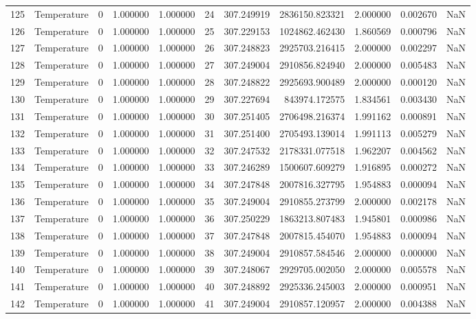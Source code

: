 \begin{tabular}{llrrrrrrrrr}
125 & Temperature & 0 & 1.000000 & 1.000000 & 24 & 307.249919 & 2836150.823321 & 2.000000 & 0.002670 & NaN \\
126 & Temperature & 0 & 1.000000 & 1.000000 & 25 & 307.229153 & 1024862.462430 & 1.860569 & 0.000796 & NaN \\
127 & Temperature & 0 & 1.000000 & 1.000000 & 26 & 307.248823 & 2925703.216415 & 2.000000 & 0.002297 & NaN \\
128 & Temperature & 0 & 1.000000 & 1.000000 & 27 & 307.249004 & 2910856.824940 & 2.000000 & 0.005483 & NaN \\
129 & Temperature & 0 & 1.000000 & 1.000000 & 28 & 307.248822 & 2925693.900489 & 2.000000 & 0.000120 & NaN \\
130 & Temperature & 0 & 1.000000 & 1.000000 & 29 & 307.227694 & 843974.172575 & 1.834561 & 0.003430 & NaN \\
131 & Temperature & 0 & 1.000000 & 1.000000 & 30 & 307.251405 & 2706498.216374 & 1.991162 & 0.000891 & NaN \\
132 & Temperature & 0 & 1.000000 & 1.000000 & 31 & 307.251400 & 2705493.139014 & 1.991113 & 0.005279 & NaN \\
133 & Temperature & 0 & 1.000000 & 1.000000 & 32 & 307.247532 & 2178331.077518 & 1.962207 & 0.004562 & NaN \\
134 & Temperature & 0 & 1.000000 & 1.000000 & 33 & 307.246289 & 1500607.609279 & 1.916895 & 0.000272 & NaN \\
135 & Temperature & 0 & 1.000000 & 1.000000 & 34 & 307.247848 & 2007816.327795 & 1.954883 & 0.000094 & NaN \\
136 & Temperature & 0 & 1.000000 & 1.000000 & 35 & 307.249004 & 2910855.273799 & 2.000000 & 0.002178 & NaN \\
137 & Temperature & 0 & 1.000000 & 1.000000 & 36 & 307.250229 & 1863213.807483 & 1.945801 & 0.000986 & NaN \\
138 & Temperature & 0 & 1.000000 & 1.000000 & 37 & 307.247848 & 2007815.454070 & 1.954883 & 0.000094 & NaN \\
139 & Temperature & 0 & 1.000000 & 1.000000 & 38 & 307.249004 & 2910857.584546 & 2.000000 & 0.000000 & NaN \\
140 & Temperature & 0 & 1.000000 & 1.000000 & 39 & 307.248067 & 2929705.002050 & 2.000000 & 0.005578 & NaN \\
141 & Temperature & 0 & 1.000000 & 1.000000 & 40 & 307.248892 & 2925336.245003 & 2.000000 & 0.000951 & NaN \\
142 & Temperature & 0 & 1.000000 & 1.000000 & 41 & 307.249004 & 2910857.120957 & 2.000000 & 0.004388 & NaN \\

\end{tabular}

